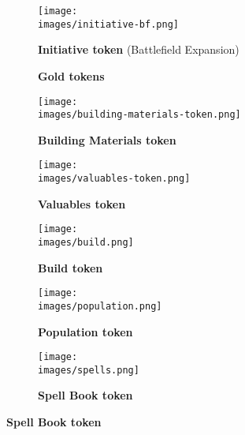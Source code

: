 \begin{figure}[H]
  \centering
  \begin{subfigure}[b]{0.16\linewidth}
    \centering
    \texttt{[image: \\images/initiative-bf.png]}
    \caption{\textbf{Initiative token} (Battlefield Expansion)}
  \end{subfigure}
  \begin{subfigure}[b]{0.2\linewidth}
    \centering
    \caption{\textbf{Gold tokens} \phantom{Population} \phantom{Population}}
  \end{subfigure}
  \begin{subfigure}[b]{0.12\linewidth}
    \centering
    \texttt{[image: \\images/building-materials-token.png]}
    \caption{\textbf{Building Materials token}}
  \end{subfigure}
  \begin{subfigure}[b]{0.12\linewidth}
    \centering
    \texttt{[image: \\images/valuables-token.png]}
    \caption{\textbf{Valuables token} \phantom{Population}}
  \end{subfigure}
  \begin{subfigure}[b]{0.12\linewidth}
    \centering
    \texttt{[image: \\images/build.png]}
    \caption{\textbf{Build token} \phantom{Population}}
  \end{subfigure}
  \begin{subfigure}[b]{0.13\linewidth}
    \centering
    \texttt{[image: \\images/population.png]}
    \caption{\textbf{Population token} \phantom{Population}}
  \end{subfigure}
  \begin{subfigure}[b]{0.12\linewidth}
    \centering
    \texttt{[image: \\images/spells.png]}
    \caption{\textbf{Spell Book token}}
  \end{subfigure}
\end{figure}
\vspace*{-3em}
